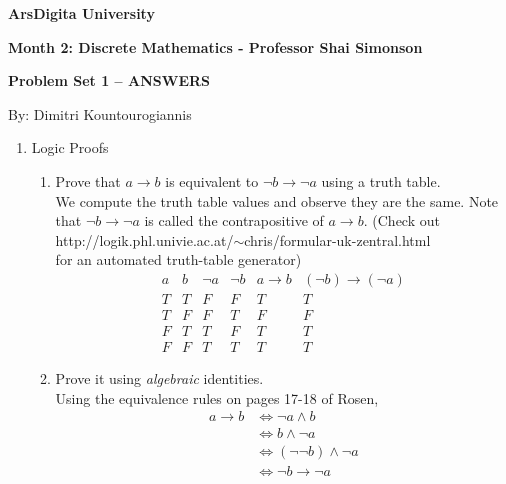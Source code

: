 \documentclass[12pt]{amsart}
\begin{document}
\begin{center}
\textbf{ArsDigita University}

\textbf{Month 2: Discrete Mathematics - Professor Shai Simonson}

\textbf{Problem Set 1 -- ANSWERS}

By: Dimitri Kountourogiannis

\end{center}


\begin{enumerate}
\item { Logic Proofs }
    \begin{enumerate}
    \item   Prove that $a \rightarrow b$
            is equivalent to $\neg b
            \rightarrow \neg a$
            using a truth table. \\
    We compute the truth table values and observe they are the same.
    Note that $\neg b \rightarrow \neg a$ is called the contrapositive
    of $a \rightarrow b$.
    (Check out \\ http://logik.phl.univie.ac.at/$\sim$chris/formular-uk-zentral.html \\
    for an automated truth-table generator)
    \[
    \begin{array}{c|c|c|c|c|c}
        a&b&\neg a&\neg b&a\rightarrow b&(\neg b) \rightarrow (\neg a)\\\hline
        T   &   T   &   F   &   F   &   T   &   T\\
        T   &   F   &   F   &   T   &   F   &   F\\
        F   &   T   &   T   &   F   &   T   &   T\\
        F   &   F   &   T   &   T   &   T   &   T
    \end{array}
    \]
    \item   Prove it using {\em algebraic} identities. \\
    Using the equivalence rules on pages 17-18 of Rosen,
        \begin{align*}
            a \rightarrow b & \Leftrightarrow \neg a \wedge b \\
                            & \Leftrightarrow b \wedge \neg a \\
                            & \Leftrightarrow (\neg \neg b) \wedge \neg a\\
                            &\Leftrightarrow \neg b \rightarrow \neg a
        \end{align*}

\end{enumerate}
\end{enumerate}
\end{document}
